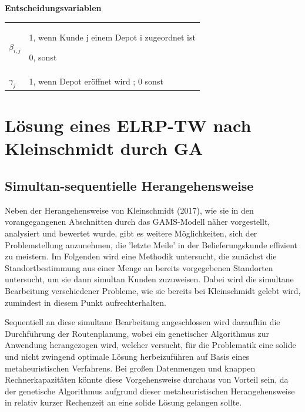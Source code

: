 \documentclass[a4paper,12pt,parskip,bibtotoc,liststotoc]{article}
\begin{document}
\vspace{40mm}
\textbf{Entscheidungsvariablen} 

\begin{table}[h!]
    \vspace*{-3mm}
    \hspace*{2mm}
  \renewcommand{\arraystretch}{1,5}
    \begin{tabular}{ll}



$\beta_{i,j}$ & 1, wenn Kunde j einem Depot i zugeordnet ist 

			0, sonst \\
        
        

$\gamma_{j}$ & 1, wenn Depot eröffnet wird
        ; 0 sonst\\
	\end{tabular}
\end{table}

\newpage




\section{Lösung eines ELRP-TW nach Kleinschmidt durch GA}


\subsection{Simultan-sequentielle Herangehensweise}

Neben der Herangehensweise von Kleinschmidt (2017), wie sie in den vorangegangenen Abschnitten durch das GAMS-Modell näher vorgestellt, analysiert und bewertet wurde, gibt es weitere Möglichkeiten, sich der Problemstellung anzunehmen, die 'letzte Meile' in der Belieferungskunde effizient zu meistern.
Im Folgenden wird eine Methodik untersucht, die zunächst die Standortbestimmung aus einer Menge an bereits vorgegebenen Standorten untersucht, um sie dann simultan Kunden zuzuweisen.
Dabei wird die simultane Bearbeitung verschiedener Probleme, wie sie bereits bei Kleinschmidt gelebt wird, zumindest in diesem Punkt aufrechterhalten.

Sequentiell an diese simultane Bearbeitung angeschlossen wird daraufhin die Durchführung der Routenplanung, wobei ein genetischer Algorithmus zur Anwendung herangezogen wird, welcher versucht, für die Problematik eine solide und nicht zwingend optimale Lösung herbeizuführen auf Basis eines metaheuristischen Verfahrens.
Bei großen Datenmengen und knappen Rechnerkapazitäten könnte diese Vorgehensweise durchaus von Vorteil sein, da der genetische Algorithmus aufgrund dieser metaheuristischen Herangehensweise in relativ kurzer Rechenzeit an eine solide Lösung gelangen sollte.
\end{document}
